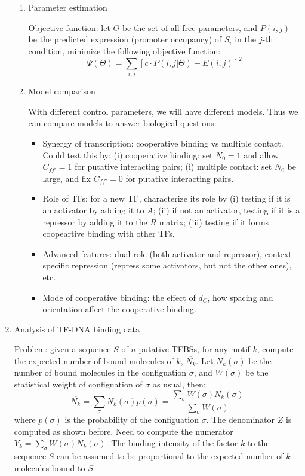 \documentclass[11pt]{article}
\begin{document}
\begin{enumerate}
\begin{enumerate}
\item{Parameter estimation}

Objective function: let $\Theta$ be the set of all free parameters, and $P(i,j)$ be the predicted expression (promoter occupancy) of $S_i$ in the $j$-th condition, minimize the following objective function: 
\begin{equation}
\Psi(\Theta) = \sum_{i,j} [c \cdot P(i,j|\Theta) - E(i,j)]^2
\end{equation}

\item{Model comparison}

With different control parameters, we will have different models. Thus we can compare models to answer biological questions: 
\begin{itemize}
\item Synergy of transcription: cooperative binding vs multiple contact. Could test this by: (i) cooperative binding: set $N_0 = 1$ and allow $C_{ff'} = 1$ for putative interacting pairs; (i) multiple contact: set $N_0$ be large, and fix $C_{ff'} = 0$ for putative interacting pairs. 
\item Role of TFs: for a new TF, characterize its role by (i) testing if it is an activator by adding it to $A$; (ii) if not an activator, testing if it is a repressor by adding it to the $R$ matrix; (iii) testing if it forms coopeartive binding with other TFs. 
\item Advanced features: dual role (both activator and repressor), context-specific repression (repress some activators, but not the other ones), etc. 
\item Mode of cooperative binding: the effect of $d_C$, how spacing and orientation affect the cooperative binding. 
\end{itemize}

\end{enumerate}

\newpage

\item{Analysis of TF-DNA binding data}

Problem: given a sequence $S$ of $n$ putative TFBSs, for any motif $k$, compute the expected number of bound molecules of $k$, $\overline{N_k}$. Let $N_k(\sigma)$ be the number of bound molecules in the configuation $\sigma$, and $W(\sigma)$ be the statistical weight of configuation of $\sigma$ as usual, then: 
\begin{equation}
\overline{N_k} = \sum_{\sigma}N_k(\sigma) p(\sigma) = \frac{\sum_{\sigma}W(\sigma)N_k(\sigma)}{\sum_{\sigma}W(\sigma)}
\end{equation}
where $p(\sigma)$ is the probability of the configuation $\sigma$. The denominator $Z$ is computed as shown before. Need to compute the numerator $Y_k = \sum_{\sigma}W(\sigma)N_k(\sigma)$. The binding intensity of the factor $k$ to the sequence $S$ can be assumed to be proportional to the expected number of $k$ molecules bound to $S$. 


\end{enumerate}
\end{document}

